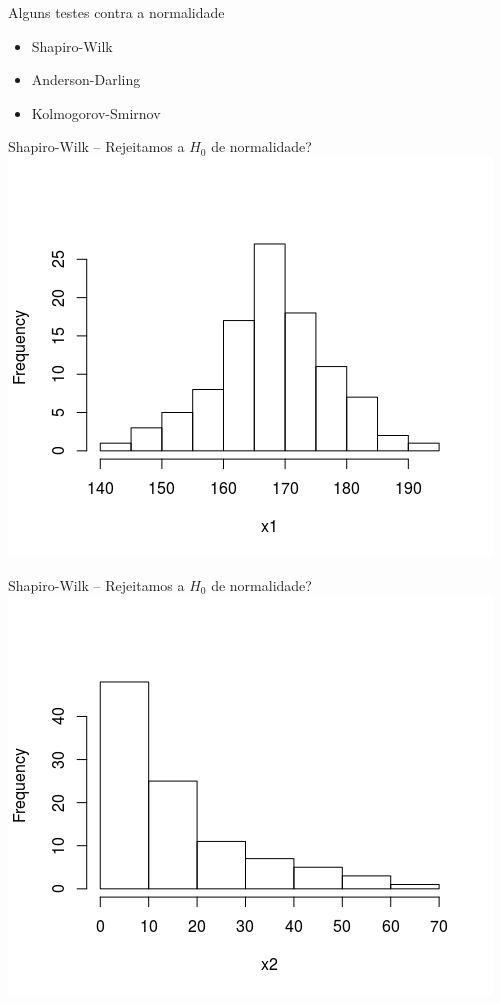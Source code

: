 \documentclass{beamer}
\begin{document}
\begin{frame}{\scriptsize Alguns testes contra a normalidade}
  \begin{itemize}
    \footnotesize
  \item<1-> \alert<2>{Shapiro-Wilk}
    \bigskip
  \item<1-> Anderson-Darling
    \bigskip
  \item<1-> Kolmogorov-Smirnov
  \end{itemize}
\end{frame}

\begin{frame}{\scriptsize Shapiro-Wilk -- Rejeitamos a $H_0$ de normalidade?}
  \centering
  \includegraphics[width=.8\textwidth]{Cap37-38/normal1-h}

  \footnotesize
\end{frame}


\begin{frame}{\scriptsize Shapiro-Wilk -- Rejeitamos a $H_0$ de normalidade?}
  \centering
  \includegraphics[width=.8\textwidth]{Cap37-38/lognormal1-h}

  \footnotesize
\end{frame}
\end{document}

